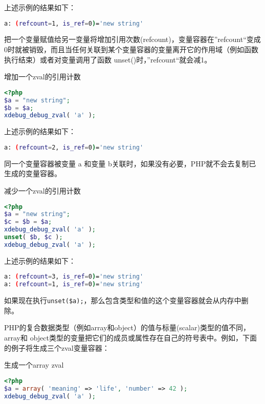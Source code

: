 上述示例的结果如下：

\begin{lstlisting}[language=bash]
a: (refcount=1, is_ref=0)='new string'
\end{lstlisting}

把一个变量赋值给另一变量将增加引用次数(refcount)，变量容器在”refcount“变成0时就被销毁，而且当任何关联到某个变量容器的变量离开它的作用域（例如函数执行结束）或者对变量调用了函数 unset()时，”refcount“就会减1。


\begin{example}
增加一个zval的引用计数
\begin{lstlisting}[language=PHP]
<?php
$a = "new string";
$b = $a;
xdebug_debug_zval( 'a' );
\end{lstlisting}
\end{example}

上述示例的结果如下：

\begin{lstlisting}[language=bash]
a: (refcount=2, is_ref=0)='new string'
\end{lstlisting}

同一个变量容器被变量 a 和变量 b关联时，如果没有必要，PHP就不会去复制已生成的变量容器。

\begin{example}
减少一个zval的引用计数
\begin{lstlisting}[language=PHP]
<?php
$a = "new string";
$c = $b = $a;
xdebug_debug_zval( 'a' );
unset( $b, $c );
xdebug_debug_zval( 'a' );
\end{lstlisting}
\end{example}

上述示例的结果如下：

\begin{lstlisting}[language=bash]
a: (refcount=3, is_ref=0)='new string'
a: (refcount=1, is_ref=0)='new string'
\end{lstlisting}

如果现在执行\texttt{unset(\$a);}，那么包含类型和值的这个变量容器就会从内存中删除。

PHP的复合数据类型（例如array和object）的值与标量(scalar)类型的值不同，array和 object类型的变量把它们的成员或属性存在自己的符号表中。例如，下面的例子将生成三个zval变量容器：


\begin{example}
生成一个array zval
\begin{lstlisting}[language=PHP]
<?php
$a = array( 'meaning' => 'life', 'number' => 42 );
xdebug_debug_zval( 'a' );
\end{lstlisting}
\end{example}

